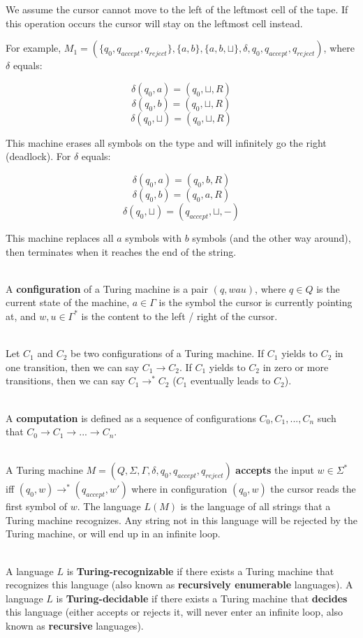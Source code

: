 \documentclass[12pt]{article}
\begin{document}
\noindent
We assume the cursor cannot move to the left of the leftmost cell of the tape.
If this operation occurs the cursor will stay on the leftmost cell instead.

\newpage
\noindent
For example, $M_1 = (\{q_0, q_{accept}, q_{reject}\}, \{a, b\}, \{a, b, \sqcup\}, \delta, q_0, q_{accept}, q_{reject})$, where $\delta$ equals:

\[ \delta(q_0, a) = (q_0, \sqcup, R) \]
\[ \delta(q_0, b) = (q_0, \sqcup, R) \]
\[ \delta(q_0, \sqcup) = (q_0, \sqcup, R) \]

\noindent
This machine erases all symbols on the type and will infinitely go the right (deadlock).
For $\delta$ equals:

\[ \delta(q_0, a) = (q_0, b, R) \]
\[ \delta(q_0, b) = (q_0, a, R) \]
\[ \delta(q_0, \sqcup) = (q_{accept}, \sqcup, -) \]

\noindent
This machine replaces all $a$ symbols with $b$ symbols (and the other way around), then terminates when it reaches the end of the string.

\noindent
\\
A \textbf{configuration} of a Turing machine is a pair $(q, wau)$, where $q \in Q$ is the current state of the machine, $a \in \Gamma$ is the symbol the cursor is currently pointing at, and $w, u \in \Gamma^*$ is the content to the left / right of the cursor.

\noindent
\\
Let $C_1$ and $C_2$ be two configurations of a Turing machine.
If $C_1$ yields to $C_2$ in one transition, then we can say $C_1 \rightarrow C_2$.
If $C_1$ yields to $C_2$ in zero or more transitions, then we can say $C_1 \rightarrow^* C_2$ ($C_1$ eventually leads to $C_2$).

\noindent
\\
A \textbf{computation} is defined as a sequence of configurations $C_0, C_1, ... , C_n$ such that $C_0 \rightarrow C_1 \rightarrow ... \rightarrow C_n$.

\noindent
\\
A Turing machine $M = (Q, \Sigma, \Gamma, \delta, q_0, q_{accept}, q_{reject})$ \textbf{accepts} the input $w \in \Sigma^*$ iff $(q_0, w) \rightarrow^* (q_{accept}, w')$ where in configuration $(q_0, w)$ the cursor reads the first symbol of $w$.
The language $L(M)$ is the language of all strings that a Turing machine recognizes.
Any string not in this language will be rejected by the Turing machine, or will end up in an infinite loop.

\noindent
\\
A language $L$ is \textbf{Turing-recognizable} if there exists a Turing machine that recognizes this language (also known as \textbf{recursively enumerable} languages).
A language $L$ is \textbf{Turing-decidable} if there exists a Turing machine that \textbf{decides} this language (either accepts or rejects it, will never enter an infinite loop, also known as \textbf{recursive} languages).
\end{document}
